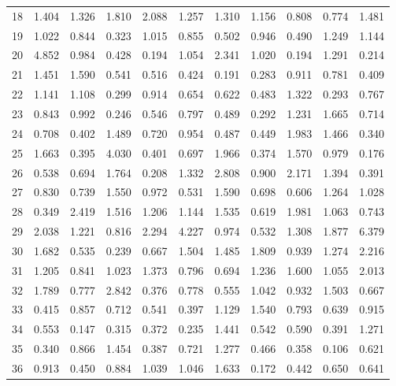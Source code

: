 \begin{tabular}{lrrrrrrrrrr}
18  &  1.404 &  1.326 &  1.810 &  2.088 &  1.257 &  1.310 &  1.156 &  0.808 &  0.774 &  1.481 \\
19  &  1.022 &  0.844 &  0.323 &  1.015 &  0.855 &  0.502 &  0.946 &  0.490 &  1.249 &  1.144 \\
20  &  4.852 &  0.984 &  0.428 &  0.194 &  1.054 &  2.341 &  1.020 &  0.194 &  1.291 &  0.214 \\
21  &  1.451 &  1.590 &  0.541 &  0.516 &  0.424 &  0.191 &  0.283 &  0.911 &  0.781 &  0.409 \\
22  &  1.141 &  1.108 &  0.299 &  0.914 &  0.654 &  0.622 &  0.483 &  1.322 &  0.293 &  0.767 \\
23  &  0.843 &  0.992 &  0.246 &  0.546 &  0.797 &  0.489 &  0.292 &  1.231 &  1.665 &  0.714 \\
24  &  0.708 &  0.402 &  1.489 &  0.720 &  0.954 &  0.487 &  0.449 &  1.983 &  1.466 &  0.340 \\
25  &  1.663 &  0.395 &  4.030 &  0.401 &  0.697 &  1.966 &  0.374 &  1.570 &  0.979 &  0.176 \\
26  &  0.538 &  0.694 &  1.764 &  0.208 &  1.332 &  2.808 &  0.900 &  2.171 &  1.394 &  0.391 \\
27  &  0.830 &  0.739 &  1.550 &  0.972 &  0.531 &  1.590 &  0.698 &  0.606 &  1.264 &  1.028 \\
28  &  0.349 &  2.419 &  1.516 &  1.206 &  1.144 &  1.535 &  0.619 &  1.981 &  1.063 &  0.743 \\
29  &  2.038 &  1.221 &  0.816 &  2.294 &  4.227 &  0.974 &  0.532 &  1.308 &  1.877 &  6.379 \\
30  &  1.682 &  0.535 &  0.239 &  0.667 &  1.504 &  1.485 &  1.809 &  0.939 &  1.274 &  2.216 \\
31  &  1.205 &  0.841 &  1.023 &  1.373 &  0.796 &  0.694 &  1.236 &  1.600 &  1.055 &  2.013 \\
32  &  1.789 &  0.777 &  2.842 &  0.376 &  0.778 &  0.555 &  1.042 &  0.932 &  1.503 &  0.667 \\
33  &  0.415 &  0.857 &  0.712 &  0.541 &  0.397 &  1.129 &  1.540 &  0.793 &  0.639 &  0.915 \\
34  &  0.553 &  0.147 &  0.315 &  0.372 &  0.235 &  1.441 &  0.542 &  0.590 &  0.391 &  1.271 \\
35  &  0.340 &  0.866 &  1.454 &  0.387 &  0.721 &  1.277 &  0.466 &  0.358 &  0.106 &  0.621 \\
36  &  0.913 &  0.450 &  0.884 &  1.039 &  1.046 &  1.633 &  0.172 &  0.442 &  0.650 &  0.641 \\

\end{tabular}
